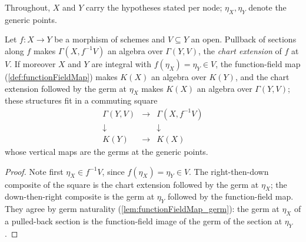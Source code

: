 Throughout, \(X\) and \(Y\) carry the hypotheses stated per node; \(\eta_X, \eta_Y\)
denote the generic points.

\begin{definition}
  \label{def:pullbackSectionsAlgebra}
  \leanok
  Let \(f : X \to Y\) be a morphism of schemes and \(V \subseteq Y\) an open. Pullback
  of sections along \(f\) makes \(\Gamma(X, f^{-1}V)\) an algebra over
  \(\Gamma(Y, V)\), the \emph{chart extension} of \(f\) at \(V\). If moreover \(X\) and
  \(Y\) are integral with \(f(\eta_X) = \eta_Y \in V\), the function-field map
  (\ref{def:functionFieldMap}) makes \(K(X)\) an algebra over \(K(Y)\), and the chart
  extension followed by the germ at \(\eta_X\) makes \(K(X)\) an algebra over
  \(\Gamma(Y, V)\); these structures fit in a commuting square
  \[
    \begin{array}{ccc}
      \Gamma(Y, V) & \longrightarrow & \Gamma(X, f^{-1}V) \\
      \downarrow & & \downarrow \\
      K(Y) & \longrightarrow & K(X)
    \end{array}
  \]
  whose vertical maps are the germs at the generic points.
\end{definition}
\begin{proof}
  \leanok
  Note first \(\eta_X \in f^{-1}V\), since \(f(\eta_X) = \eta_Y \in V\). The
  right-then-down composite of the square is the chart extension followed by the germ
  at \(\eta_X\); the down-then-right composite is the germ at \(\eta_Y\) followed by
  the function-field map. They agree by germ naturality
  (\ref{lem:functionFieldMap_germ}): the germ at \(\eta_X\) of a pulled-back section is
  the function-field image of the germ of the section at \(\eta_Y\).
\end{proof}

